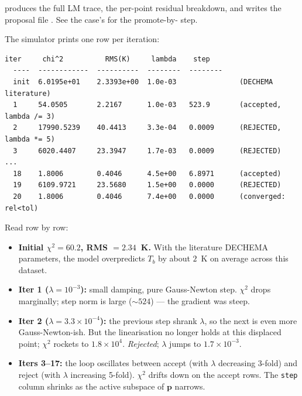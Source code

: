 \documentclass[11pt,a4paper]{article}
\newcommand{\pv}{\mathbf{p}}                          %
\begin{document}
\begin{tutoriallink}
 produces the full
LM trace, the per-point residual breakdown, and writes the proposal
file .
See the case's  for the promote-by- step.
\end{tutoriallink}

\begin{example}
The simulator prints one row per iteration:
\begin{lstlisting}[basicstyle=\ttfamily\scriptsize]
  iter     chi^2          RMS(K)     lambda    step
  ----  ------------  ----------  --------  --------
  init  6.0195e+01    2.3393e+00  1.0e-03               (DECHEMA literature)
  1     54.0505       2.2167      1.0e-03   523.9       (accepted, lambda /= 3)
  2     17990.5239    40.4413     3.3e-04   0.0009      (REJECTED, lambda *= 5)
  3     6020.4407     23.3947     1.7e-03   0.0009      (REJECTED)
...
  18    1.8006        0.4046      4.5e+00   6.8971      (accepted)
  19    6109.9721     23.5680     1.5e+00   0.0000      (REJECTED)
  20    1.8006        0.4046      7.4e+00   0.0000      (converged: rel<tol)
\end{lstlisting}
Read row by row:
\begin{itemize}[leftmargin=*,nosep]
  \item \textbf{Initial $\chi^2 = 60.2$, RMS $= 2.34$~K.} With the
        literature DECHEMA parameters, the model overpredicts $T_b$
        by about $2$~K on average across this dataset.
  \item \textbf{Iter 1 ($\lambda = 10^{-3}$):} small damping, pure
        Gauss-Newton step. $\chi^2$ drops marginally; step norm is
        large ($\sim 524$) --- the gradient was steep.
  \item \textbf{Iter 2 ($\lambda = 3.3 \times 10^{-4}$):} the previous
        step shrank $\lambda$, so the next is even more Gauss-Newton-ish.
        But the linearisation no longer holds at this displaced point;
        $\chi^2$ rockets to $1.8\times 10^4$. \emph{Rejected};
        $\lambda$ jumps to $1.7\times 10^{-3}$.
  \item \textbf{Iters 3--17:} the loop oscillates between accept (with
        $\lambda$ decreasing 3-fold) and reject (with $\lambda$
        increasing 5-fold). $\chi^2$ drifts down on the accept
        rows. The \texttt{step} column shrinks as the active subspace
        of $\pv$ narrows.

\end{itemize}
\end{example}
\end{document}
